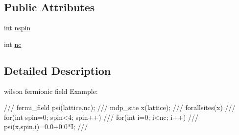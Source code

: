 \subsection*{Public Attributes}
\begin{DoxyCompactItemize}
\item 
int \hyperlink{classfermi__field_a664546510ce0d76d234d6526c3c0282b}{nspin}
\item 
int \hyperlink{classfermi__field_a10875de82035b0689d0229ea80c8f089}{nc}
\end{DoxyCompactItemize}


\subsection{Detailed Description}
wilson fermionic field Example: \begin{DoxyVerb}
/// fermi_field psi(lattice,nc);
/// mdp_site x(lattice);
/// forallsites(x)
///    for(int spin=0; spin<4; spin++)
///      for(int i=0; i<nc; i++)
///        psi(x,spin,i)=0.0+0.0*I;
/// \end{DoxyVerb}
 

